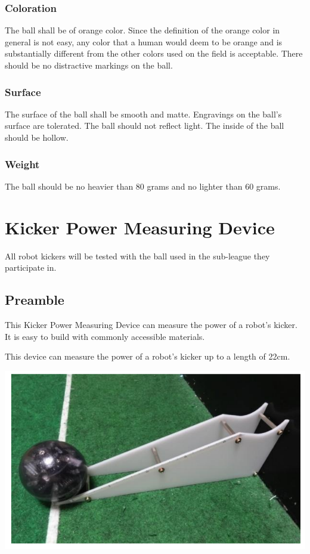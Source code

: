 \documentclass{article}
\begin{document}
\subsubsection{Coloration}

The ball shall be of orange color. Since the definition of the orange color in
general is not easy, any color that a human would deem to be orange and is
substantially different from the other colors used on the field is acceptable.
There should be no distractive markings on the ball.

\subsubsection{Surface}

The surface of the ball shall be smooth and matte. Engravings on the ball's
surface are tolerated. The ball should not reflect light. The inside of the
ball should be hollow.

\subsubsection{Weight}

The ball should be no heavier than 80 grams and no lighter than 60 grams.

\section{Kicker Power Measuring Device\label{ref-064}}

All robot kickers will be tested with the ball used in the sub-league they
participate in.

\subsection{Preamble}

This Kicker Power Measuring Device can measure the power of a robot's kicker.
It is easy to build with commonly accessible materials.

This device can measure the power of a robot's kicker up to a length of 22cm.

\includegraphics[width=1\textwidth]{media/image8.png}
\end{document}
